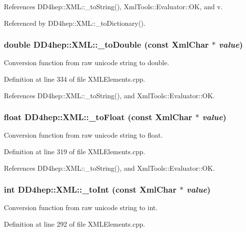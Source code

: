 References DD4hep::XML::\_\-toString(), XmlTools::Evaluator::OK, and v.

Referenced by DD4hep::XML::\_\-toDictionary().\hypertarget{group___d_d4_h_e_p___x_m_l_gace8029e843a4c94cf50bd9adc32cd6f6}{
\subsubsection[{\_\-toDouble}]{\setlength{\rightskip}{0pt plus 5cm}double DD4hep::XML::\_\-toDouble (const XmlChar $\ast$ {\em value})}}
\label{group___d_d4_h_e_p___x_m_l_gace8029e843a4c94cf50bd9adc32cd6f6}


Conversion function from raw unicode string to double. 

Definition at line 334 of file XMLElements.cpp.

References DD4hep::XML::\_\-toString(), and XmlTools::Evaluator::OK.\hypertarget{group___d_d4_h_e_p___x_m_l_ga74d0ba6278b3baa645887da2151279ee}{
\subsubsection[{\_\-toFloat}]{\setlength{\rightskip}{0pt plus 5cm}float DD4hep::XML::\_\-toFloat (const XmlChar $\ast$ {\em value})}}
\label{group___d_d4_h_e_p___x_m_l_ga74d0ba6278b3baa645887da2151279ee}


Conversion function from raw unicode string to float. 

Definition at line 319 of file XMLElements.cpp.

References DD4hep::XML::\_\-toString(), and XmlTools::Evaluator::OK.\hypertarget{group___d_d4_h_e_p___x_m_l_ga8b2fbc55c4631087c0c5e905327f04d0}{
\subsubsection[{\_\-toInt}]{\setlength{\rightskip}{0pt plus 5cm}int DD4hep::XML::\_\-toInt (const XmlChar $\ast$ {\em value})}}
\label{group___d_d4_h_e_p___x_m_l_ga8b2fbc55c4631087c0c5e905327f04d0}


Conversion function from raw unicode string to int. 

Definition at line 292 of file XMLElements.cpp.

